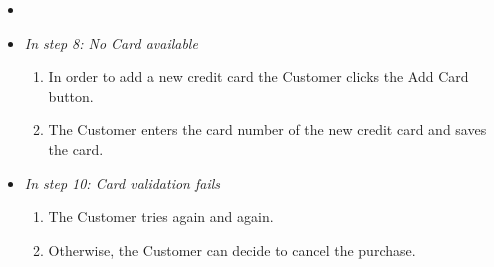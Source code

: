 \begin{description}[font=\normalfont\itshape]
\item[Alternative or Exceptional Processes]
\begin{itemize}[leftmargin=.3cm]
\item[]
\item \textit{In step 8: No Card available}
	\begin{enumerate}[leftmargin=.5cm]
		\item In order to add a new credit card the Customer clicks the Add Card button.
		\item The Customer enters the card number of the new credit card and saves the card.
	\end{enumerate}
	
	\item \textit{In step 10: Card validation fails}
	\begin{enumerate}[leftmargin=.5cm]
		\item The Customer tries again and again.
		\item Otherwise, the Customer can decide to cancel the purchase.
	\end{enumerate}
\end{itemize}
\end{description}


